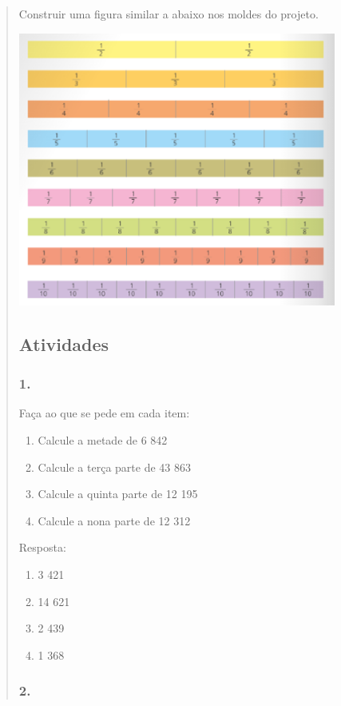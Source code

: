 \begin{enumerate}
\begin{escolha}
\begin{enumerate}
\begin{itemize}
\begin{itemize}
\begin{escolha}
\begin{quote}
\begin{escolha}
{Construir uma figura similar a abaixo nos moldes do projeto.

\includegraphics[width=4.12179in,height=3.54348in]{media/image106.png}

\subsection{Atividades}\label{atividades-8}

\subsubsection{1.}\label{section-104}

Faça ao que se pede em cada item:

\begin{enumerate}
\def\labelenumi{\alph{enumi})}
\item
  Calcule a metade de 6 842
\item
  Calcule a terça parte de 43 863
\item
  Calcule a quinta parte de 12 195
\item
  Calcule a nona parte de 12 312
\end{enumerate}

Resposta:

\begin{enumerate}
\def\labelenumi{\alph{enumi})}
\item
  3 421
\item
  14 621
\item
  2 439
\item
  1 368
\end{enumerate}

\subsubsection{2.}\label{section-105}

}
\end{escolha}
\end{quote}
\end{escolha}
\end{itemize}
\end{itemize}
\end{enumerate}
\end{escolha}
\end{enumerate}
